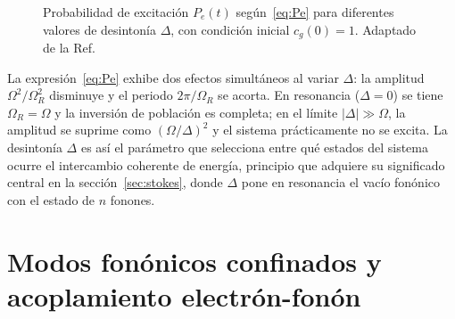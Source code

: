 \begin{figure}[h]
	\caption{Probabilidad de excitación $P_e(t)$ según~\eqref{eq:Pe} para diferentes valores de desintonía $\Delta$, con condición inicial $c_g(0)=1$. Adaptado de la Ref.~\cite{steck2007}}
	\label{fig:rabi_oscilaciones}
\end{figure}

La expresión~\eqref{eq:Pe} exhibe dos efectos simultáneos al variar $\Delta$: la amplitud $\Omega^2/\Omega_R^2$ disminuye y el periodo $2\pi/\Omega_R$ se acorta. En resonancia ($\Delta=0$) se tiene $\Omega_R=\Omega$ y la inversión de población es completa; en el límite $|\Delta|\gg\Omega$, la amplitud se suprime como $(\Omega/\Delta)^2$ y el sistema prácticamente no se excita. La desintonía $\Delta$ es así el parámetro que selecciona entre qué estados del sistema ocurre el intercambio coherente de energía, principio que adquiere su significado central en la sección~\ref{sec:stokes}, donde $\Delta$ pone en resonancia el vacío fonónico con el estado de $n$ fonones. 


\section{Modos fonónicos confinados y acoplamiento electrón-fonón}
\label{sec:fonones}

